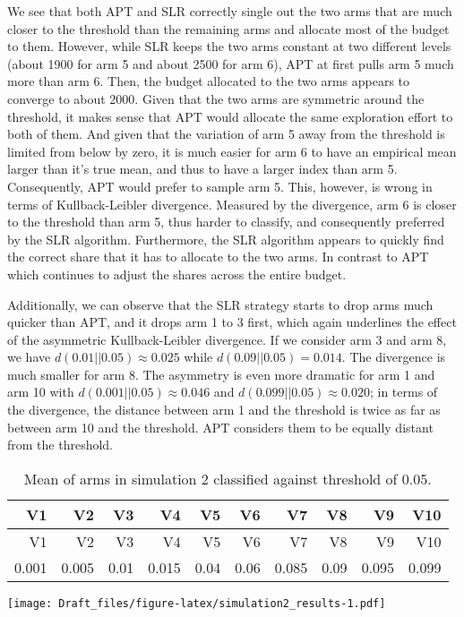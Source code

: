 \documentclass[12pt,]{article}
\begin{document}
We see that both APT and SLR correctly single out the two arms that are
much closer to the threshold than the remaining arms and allocate most
of the budget to them. However, while SLR keeps the two arms constant at
two different levels (about 1900 for arm 5 and about 2500 for arm 6),
APT at first pulls arm 5 much more than arm 6. Then, the budget
allocated to the two arms appears to converge to about 2000. Given that
the two arms are symmetric around the threshold, it makes sense that APT
would allocate the same exploration effort to both of them. And given
that the variation of arm 5 away from the threshold is limited from
below by zero, it is much easier for arm 6 to have an empirical mean
larger than it's true mean, and thus to have a larger index than arm 5.
Consequently, APT would prefer to sample arm 5. This, however, is wrong
in terms of Kullback-Leibler divergence. Measured by the divergence, arm
6 is closer to the threshold than arm 5, thus harder to classify, and
consequently preferred by the SLR algorithm. Furthermore, the SLR
algorithm appears to quickly find the correct share that it has to
allocate to the two arms. In contrast to APT which continues to adjust
the shares across the entire budget.

Additionally, we can observe that the SLR strategy starts to drop arms
much quicker than APT, and it drops arm 1 to 3 first, which again
underlines the effect of the asymmetric Kullback-Leibler divergence. If
we consider arm 3 and arm 8, we have \(d(0.01||0.05) \approx 0.025\)
while \(d(0.09||0.05) = 0.014\). The divergence is much smaller for arm
8. The asymmetry is even more dramatic for arm 1 and arm 10 with
\(d(0.001||0.05) \approx 0.046\) and \(d(0.099||0.05) \approx 0.020\);
in terms of the divergence, the distance between arm 1 and the threshold
is twice as far as between arm 10 and the threshold. APT considers them
to be equally distant from the threshold.

\begin{longtable}[]{@{}rrrrrrrrrr@{}}
\caption{Mean of arms in simulation 2 classified against threshold of
0.05.}\tabularnewline
\toprule
V1 & V2 & V3 & V4 & V5 & V6 & V7 & V8 & V9 & V10\tabularnewline
\midrule
\endfirsthead
\toprule
V1 & V2 & V3 & V4 & V5 & V6 & V7 & V8 & V9 & V10\tabularnewline
\midrule
\endhead
0.001 & 0.005 & 0.01 & 0.015 & 0.04 & 0.06 & 0.085 & 0.09 & 0.095 &
0.099\tabularnewline
\bottomrule
\end{longtable}

\texttt{[image: Draft\_files/figure-latex/simulation2\_results-1.pdf]}
\end{document}
